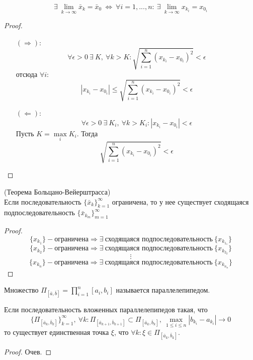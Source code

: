 \begin{theorem}
    \[\exists\ \lim\limits_{k\to \infty}\bar{x}_k=\bar{x}_0\ \Leftrightarrow\ \forall i=1,...,n:\ \exists\ \lim\limits_{k\to \infty}x_{k_i}=x_{0_i}\]
\end{theorem} 
\begin{proof}\tab
    \begin{itemize}
        \item[$(\Rightarrow)$:] \[\forall \epsilon>0\ \exists\ K,\ \forall k>K: \sqrt{\sum\limits_{i=1}^{n}(x_{k_i}-x_{0_i})^2}<\epsilon\]
        отсюда $\forall i$:
        \[|x_{k_i}-x_{0_i}|\leq \sqrt{\sum\limits_{i=1}^{n}(x_{k_i}-x_{0_i})^2} <\epsilon\]
        \item[$(\Leftarrow)$:] \[\forall \epsilon>0\ \exists\ K_i,\ \forall k>K_i: |x_{k_i}-x_{0_i}|<\epsilon\]
        Пусть $K=\max\limits_i K_i$. Тогда
        \[\sqrt{\sum\limits_{i=1}^{n}(x_{k_i}-x_{0_i})^2}<\epsilon\]
    \end{itemize}
\end{proof} 
\begin{theorem} (Теорема Больцано-Вейерштрасса)\\
    Если последовательность $\{\bar{x}_k\}_{k=1}^{\infty}$ ограничена, то у нее существует сходящаяся подпоследовательность $\{\bar{x}_{k_m}\}_{m=1}^{\infty}$
\end{theorem} 
\begin{proof}
    \[\{x_{k_1}\} - \text{ограничена} \Rightarrow \exists\ \text{сходящаяся подпоследовательность}\ \{x_{k_{1_1}}\}\]
    \[\{x_{k_2}\} - \text{ограничена} \Rightarrow \exists\ \text{сходящаяся подпоследовательность}\ \{x_{k_{2_2}}\}\]
    \[\vdots\]
    \[\{x_{k_n}\} - \text{ограничена} \Rightarrow \exists\ \text{сходящаяся подпоследовательность}\ \{x_{k_{n_n}}\}\]
\end{proof} 
\begin{definition}
    Множество $\Pi_{[\bar{a}, \bar{b}]}=\prod\limits_{i=1}^{n}[a_i,b_i]$ называется параллелепипедом.
\end{definition} 
\begin{theorem}
    Если последовательность вложенных параллелепипедов такая, что
    \[\{\Pi_{[\bar{a}_k, \bar{b}_k]}\}_{k=1}^{\infty},\ \forall k: \Pi_{[\bar{a}_{k+1}, \bar{b}_{k+1}]} \subset \Pi_{[\bar{a}_{k}, \bar{b}_{k}]},\ \max\limits_{1\leq i\leq n}|b_{k_i}-a_{k_i}| \to 0\]
    то существует единственная точка $\xi$, что $\forall k: \xi\in \Pi_{[\bar{a}_k, \bar{b}_k]}$.
\end{theorem} 
\begin{proof}
    Очев.
\end{proof}
